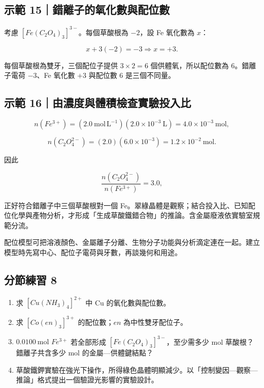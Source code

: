 \documentclass[11pt,a4paper]{article}
\providecommand{\tightlist}{%
  \setlength{\itemsep}{0pt}\setlength{\parskip}{0pt}}
\begin{document}
\begin{HandoutWorkedExample}

\subsection{示範 15｜錯離子的氧化數與配位數}\label{ux793aux7bc4-15ux932fux96e2ux5b50ux7684ux6c27ux5316ux6578ux8207ux914dux4f4dux6578}

考慮 \([Fe(C_2O_4)_3]^{3-}\)。每個草酸根為 \(-2\)，設 Fe 氧化數為 \(x\)：

\[
x+3(-2)=-3\Rightarrow x=+3.
\]

每個草酸根為雙牙，三個配位子提供 \(3\times2=6\) 個供體氧，所以配位數為 \(6\)。錯離子電荷 \(-3\)、Fe 氧化數 \(+3\) 與配位數 \(6\) 是三個不同量。

\end{HandoutWorkedExample}

\begin{HandoutWorkedExample}

\subsection{示範 16｜由濃度與體積檢查實驗投入比}\label{ux793aux7bc4-16ux7531ux6fc3ux5ea6ux8207ux9ad4ux7a4dux6aa2ux67e5ux5be6ux9a57ux6295ux5165ux6bd4}

\[
n(Fe^{3+})=(2.0\ \mathrm{mol\,L^{-1}})(2.0\times10^{-3}\ \mathrm{L})=4.0\times10^{-3}\ \mathrm{mol},
\]

\[
n(C_2O_4^{2-})=(2.0)(6.0\times10^{-3})=1.2\times10^{-2}\ \mathrm{mol}.
\]

因此

\[
\frac{n(C_2O_4^{2-})}{n(Fe^{3+})}=3.0,
\]

正好符合錯離子中三個草酸根對一個 Fe。翠綠晶體是觀察；結合投入比、已知配位化學與產物分析，才形成「生成草酸鐵錯合物」的推論。含金屬廢液依實驗室規範分流。

\end{HandoutWorkedExample}

配位模型可把溶液顏色、金屬離子分離、生物分子功能與分析滴定連在一起。建立模型時先寫中心、配位子電荷與牙數，再談幾何和用途。

\subsection{分節練習 8}\label{ux5206ux7bc0ux7df4ux7fd2-8}

\begin{enumerate}
\def\labelenumi{\arabic{enumi}.}
\tightlist
\item
  求 \([Cu(NH_3)_4]^{2+}\) 中 Cu 的氧化數與配位數。
\item
  求 \([Co(en)_3]^{3+}\) 的配位數；\(en\) 為中性雙牙配位子。
\item
  \(0.0100\ \mathrm{mol}\) \(Fe^{3+}\) 若全部形成 \([Fe(C_2O_4)_3]^{3-}\)，至少需多少 mol 草酸根？錯離子共含多少 mol 的金屬---供體鍵結點？
\item
  草酸鐵鉀實驗在強光下操作，所得綠色晶體明顯減少。以「控制變因---觀察---推論」格式提出一個驗證光影響的實驗設計。
\end{enumerate}
\end{document}
